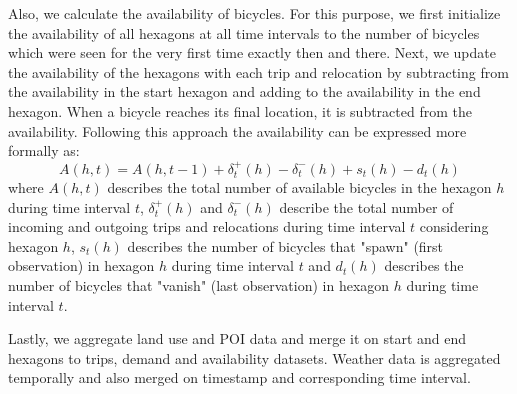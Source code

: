 Also, we calculate the availability of bicycles. For this purpose, we first initialize the availability of all hexagons at all time intervals to the number of bicycles which were seen for the very first time exactly then and there.
Next, we update the availability of the hexagons with each trip and relocation by subtracting from the availability in the start hexagon and adding to the availability in the end hexagon.
When a bicycle reaches its final location, it is subtracted from the availability.
Following this approach the availability can be expressed more formally as:
\[A(h, t) = A(h, t-1) + \delta_t^+(h) - \delta_t^-(h) + s_t(h) - d_t(h)\]
where \(A(h, t)\) describes the total number of available bicycles in the hexagon \(h\) during time interval \(t\),
\(\delta_t^+(h)\) and \(\delta_t^-(h)\) describe the total number of incoming and outgoing trips and relocations during time interval \(t\) considering hexagon \(h\),
\(s_t(h)\) describes the number of bicycles that "spawn" (first observation) in hexagon \(h\) during time interval \(t\) and
\(d_t(h)\) describes the number of bicycles that "vanish" (last observation) in hexagon \(h\) during time interval \(t\).

Lastly, we aggregate land use and POI data and merge it on start and end hexagons to trips, demand and availability datasets. Weather data is aggregated temporally and also merged on timestamp and corresponding time interval.
